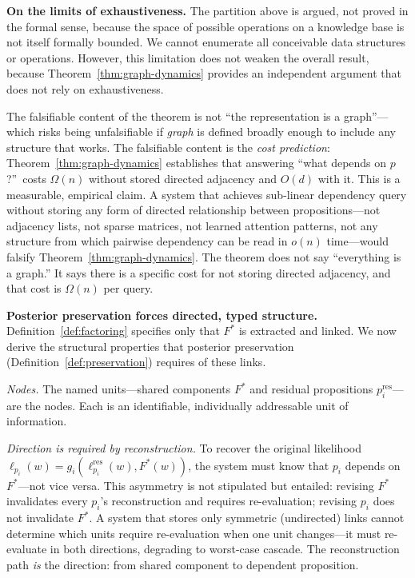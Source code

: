 \documentclass[11pt]{article}
\theoremstyle{definition}
\begin{document}
\textbf{On the limits of exhaustiveness.}
The partition above is argued, not proved in the formal sense, because
the space of possible operations on a knowledge base is not itself
formally bounded. We cannot enumerate all conceivable data structures
or operations. However, this limitation does not weaken the overall
result, because Theorem~\ref{thm:graph-dynamics} provides an
independent argument that does not rely on exhaustiveness.

The falsifiable content of the theorem is not ``the representation is a
graph''---which risks being unfalsifiable if \emph{graph} is defined
broadly enough to include any structure that works. The falsifiable
content is the \emph{cost prediction}: Theorem~\ref{thm:graph-dynamics}
establishes that answering ``what depends on $p$?''\ costs $\Omega(n)$
without stored directed adjacency and $O(d)$ with it. This is a
measurable, empirical claim. A system that achieves sub-linear
dependency query without storing any form of directed relationship
between propositions---not adjacency lists, not sparse matrices, not
learned attention patterns, not any structure from which pairwise
dependency can be read in $o(n)$ time---would falsify
Theorem~\ref{thm:graph-dynamics}. The theorem does not say ``everything
is a graph.'' It says there is a specific cost for not storing directed
adjacency, and that cost is $\Omega(n)$ per query.

\textbf{Posterior preservation forces directed, typed structure.}
Definition~\ref{def:factoring} specifies only that $F^*$ is extracted
and linked. We now derive the structural properties that posterior
preservation (Definition~\ref{def:preservation}) requires of these
links.

\emph{Nodes.} The named units---shared components $F^*$ and residual
propositions $p_i^{\text{res}}$---are the nodes. Each is an
identifiable, individually addressable unit of information.

\emph{Direction is required by reconstruction.}
To recover the original likelihood $\ell_{p_i}(w) =
g_i(\ell_{p_i}^{\text{res}}(w), F^*(w))$, the system must know that
$p_i$ depends on $F^*$---not vice versa. This asymmetry is not
stipulated but entailed: revising $F^*$ invalidates every $p_i$'s
reconstruction and requires re-evaluation; revising $p_i$ does not
invalidate $F^*$. A system that stores only symmetric (undirected)
links cannot determine which units require re-evaluation when one
unit changes---it must re-evaluate in both directions, degrading
to worst-case cascade. The reconstruction path \emph{is} the
direction: from shared component to dependent proposition.
\end{document}
